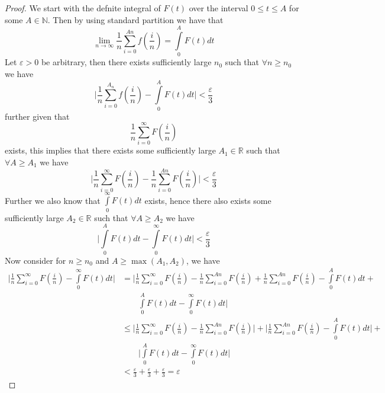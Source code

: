 \documentclass[a4 paper]{article}
\newcommand{\?}{\stackrel{?}{=}}
\begin{document}
\begin{tcolorbox}[breakable,colback=blue!5!white, colframe=blue!50!black]
\begin{proof}
We start with the defnite integral of $ F(t) $ over the interval $ 0 \leq t \leq A $ for some $ A \in \mathbb{N} $. Then by using standard partition we have that 
$$  \lim\limits_{n  \to \infty} \frac{1}{n} \sum\limits_{i=0}^{An } f\left(\frac{i}{n}\right)  = \int\limits_{0}^{A } F(t)dt  $$
Let $ \varepsilon > 0 $ be arbitrary, then there exists sufficiently large $ n_0   $ such that $ \forall  n \geq n_0  $ we have 
$$ \bigg| \frac{1}{n} \sum\limits_{i=0}^{A_n} f\left(\frac{i}{n}\right) - \int\limits_{0}^{A } F(t)d t \bigg| < \frac{\varepsilon}{3}  $$
further given that $$ \frac{1}{n} \sum\limits_{i=0}^{\infty} F\left(\frac{i}{n}\right) $$ exists, this implies that there exists some sufficiently large $ A_1 \in \mathbb{R} $ such that $ \forall  A \geq A_1  $ we have 
$$ \bigg| \frac{1}{n} \sum\limits_{i=0}^{\infty} F\left(\frac{i}{n}\right) - \frac{1}{n} \sum\limits_{i=0}^{An } F\left(\frac{i}{n}\right) \bigg| < \frac{\varepsilon}{3} $$
Further we also know that $ \int\limits_{0}^{\infty} F(t)dt  $ exists, hence there also exists some sufficiently large $ A_2 \in \mathbb{R} $ such that $ \forall A \geq A_2  $ we have 
$$ \bigg| \int\limits_{0}^{A    } F(t)dt - \int\limits_{0}^{\infty} F(t) dt \bigg| < \frac{\varepsilon}{3} $$
Now consider for $ n \geq  n_0 $ and $ A \geq \max(A_1 , A_2 )  $, we have
\begin{align*}
    \bigg| \frac{1}{n}\sum\limits_{i=0}^{\infty} F\left(\frac{i}{n}\right) - \int\limits_{0}^{\infty} F(t)d t \bigg| & = \bigg|\frac{1}{n}\sum\limits_{i=0}^{\infty} F\left(\frac{i}{n}\right) - \frac{1}{n} \sum\limits_{i=0}^{An} F\left(\frac{i}{n}\right) + \frac{1}{n} \sum\limits_{i=0}^{An  } F \left(\frac{i}{n}\right) - \int\limits_{0}^{A } F(t)dt +  \\
    & \qquad  \int\limits_{0}^{A}F(t)d t -   \int\limits_{0}^{\infty} F(t)d t \bigg| \\ 
                                                                                                                        & \leq \bigg|\frac{1}{n}\sum\limits_{i=0}^{\infty} F\left(\frac{i}{n}\right) - \frac{1}{n} \sum\limits_{i=0}^{An} F\left(\frac{i}{n}\right)\bigg| + \bigg|\frac{1}{n} \sum\limits_{i=0}^{An  } F \left(\frac{i}{n}\right) - \int\limits_{0}^{A } F(t)dt\bigg| + \\ 
                                                                                                                        & \qquad  \bigg|\int\limits_{0}^{A}F(t)d t -   \int\limits_{0}^{\infty} F(t)d t \bigg| \\  
                                                                                                                        & < \frac{\varepsilon}{3} + \frac{\varepsilon}{3} + \frac{\varepsilon}{3} = \varepsilon
\end{align*}
\end{proof}
\end{tcolorbox}
\end{document}
